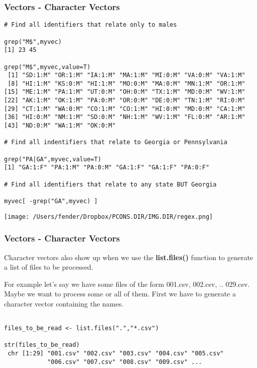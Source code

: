 \documentclass{beamer}
\begin{document}
%
\begin{frame}[fragile]
\frametitle{Vectors - Character Vectors}
\scriptsize
\begin{verbatim}
# Find all identifiers that relate only to males

grep("M$",myvec)
[1] 23 45

grep("M$",myvec,value=T)
 [1] "SD:1:M" "OR:1:M" "IA:1:M" "MA:1:M" "MI:0:M" "VA:0:M" "VA:1:M"
 [8] "HI:1:M" "KS:0:M" "HI:1:M" "MO:0:M" "MA:0:M" "MN:1:M" "OR:1:M"
[15] "ME:1:M" "PA:1:M" "UT:0:M" "OH:0:M" "TX:1:M" "MD:0:M" "WV:1:M"
[22] "AK:1:M" "OK:1:M" "PA:0:M" "OR:0:M" "DE:0:M" "TN:1:M" "RI:0:M"
[29] "CT:1:M" "WA:0:M" "CO:1:M" "CO:1:M" "HI:0:M" "MD:0:M" "CA:1:M"
[36] "HI:0:M" "NM:1:M" "SD:0:M" "NH:1:M" "WV:1:M" "FL:0:M" "AR:1:M"
[43] "ND:0:M" "WA:1:M" "OK:0:M"

# Find all indentifiers that relate to Georgia or Pennsylvania

grep("PA|GA",myvec,value=T)
[1] "GA:1:F" "PA:1:M" "PA:0:M" "GA:1:F" "GA:1:F" "PA:0:F"

# Find all identifiers that relate to any state BUT Georgia

myvec[ -grep("GA",myvec) ]
\end{verbatim}
\end{frame}

%
\begin{frame}[fragile]
\begin{center}
\texttt{[image: /Users/fender/Dropbox/PCONS.DIR/IMG.DIR/regex.png]}
\end{center}
\end{frame}

\begin{frame}[fragile]
\frametitle{Vectors - Character Vectors}
Character vectors also show up when we use the \textbf{list.files()} function to generate a list of files to be processed. 

For example let's say we have some files of the form 001.csv, 002.csv, .. 029.csv. Maybe we want to process some or all of them. First we have to generate a character vector containing the names. 
\small
\begin{verbatim}

files_to_be_read <- list.files(".","*.csv")

str(files_to_be_read)
 chr [1:29] "001.csv" "002.csv" "003.csv" "004.csv" "005.csv" 
            "006.csv" "007.csv" "008.csv" "009.csv" ...
            

\end{verbatim}
\end{frame}
\end{document}

